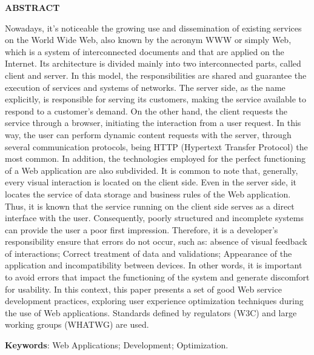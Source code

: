 \vfill
\begin{center}
{\textbf{ABSTRACT}\\}
\end{center}

\noindent

Nowadays, it’s noticeable the growing use and dissemination of existing services on the World Wide Web, also known by the acronym WWW or simply Web, which is a system of interconnected documents and that are applied on the Internet. Its architecture is divided mainly into two interconnected parts, called client and server. In this model, the responsibilities are shared and guarantee the execution of services and systems of networks. The server side, as the name explicitly, is responsible for serving its customers, making the service available to respond to a customer's demand. On the other hand, the client requests the service through a browser, initiating the interaction from a user request. In this way, the user can perform dynamic content requests with the server, through several communication protocols, being HTTP (Hypertext Transfer Protocol) the most common. In addition, the technologies employed for the perfect functioning of a Web application are also subdivided. It is common to note that, generally, every visual interaction is located on the client side. Even in the server side, it locates the service of data storage and business rules of the Web application.  Thus, it is known that the service running on the client side serves as a direct interface with the user. Consequently, poorly structured and incomplete systems can provide the user a poor first impression. Therefore, it is a developer’s responsibility ensure that errors do not occur, such as: absence of visual feedback of interactions; Correct treatment of data and validations; Appearance of the application and incompatibility between devices. In other words, it is important to avoid errors that impact the functioning of the system and generate discomfort for usability. In this context, this paper presents a set of good Web service development practices, exploring user experience optimization techniques during the use of Web applications. Standards defined by regulators (W3C) and large working groups (WHATWG) are used. 
 
 \vspace{\onelineskip}
    
 \noindent
 \textbf{Keywords}: Web Applications; Development; Optimization.
